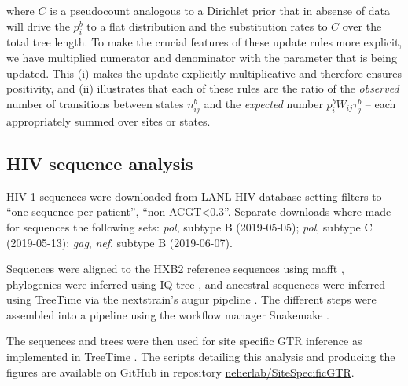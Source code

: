 \documentclass[aps,rmp,twocolumn]{revtex4}
\newcommand{\gene}[1]{{\it #1}}
\newcommand{\eqp}{p}
\begin{document}
where $C$ is a pseudocount analogous to a Dirichlet prior that in absense of data will drive the $\eqp_i^b$ to a flat distribution and the substitution rates to $C$ over the total tree length.
To make the crucial features of these update rules more explicit, we have multiplied numerator and denominator with the parameter that is being updated. This (i) makes the update explicitly multiplicative and therefore ensures positivity, and (ii) illustrates that each of these rules are the ratio of the {\it observed} number of transitions between states $n^b_{ij}$ and the {\it expected} number $\eqp^b_i W_{ij}\tau_j^b$ -- each appropriately summed over sites or states.


\subsection*{HIV sequence analysis}
HIV-1 sequences were downloaded from LANL HIV database \citep{LANL} setting filters to ``one sequence per patient'', ``non-ACGT\textless 0.3''.
Separate downloads where made for sequences the following sets: \gene{pol}, subtype B (2019-05-05); \gene{pol}, subtype C (2019-05-13); \gene{gag}, \gene{nef}, subtype B (2019-06-07).

Sequences were aligned to the HXB2 reference sequences using mafft \citep{katoh2013mafft}, phylogenies were inferred using IQ-tree \citep{nguyen_iq-tree:_2015}, and ancestral sequences were inferred using TreeTime \citep{sagulenko2017treetime} via the nextstrain's augur pipeline \citep{hadfield_nextstrain:_2018}.
The different steps were assembled into a pipeline using the workflow manager Snakemake \citep{koster_snakemakescalable_2012}.

The sequences and trees were then used for site specific GTR inference as implemented in TreeTime \citep{sagulenko2017treetime}.
The scripts detailing this analysis and producing the figures are available on GitHub in repository \href{https://github.com/neherlab/SiteSpecificGTR}{neherlab/SiteSpecificGTR}.

\clearpage
\appendix
\renewcommand{\thefigure}{S\arabic{figure}}
\renewcommand{\thetable}{S\arabic{table}}
\setcounter{figure}{0}
\setcounter{table}{0}
\end{document}
